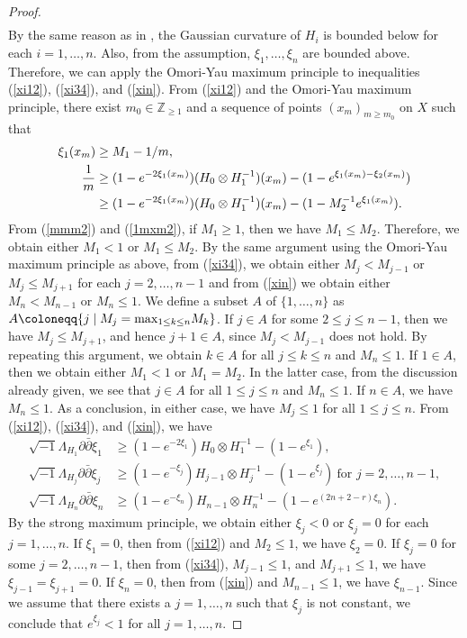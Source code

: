 \documentclass[12pt]{article}
\theoremstyle{definition}
\def\max{{\rm max}}
\def\Z{{\mathbb Z}}
\def\inum{{\sqrt{-1}}}
\begin{document}
\begin{proof}
\begin{align}
\end{align}
By the same reason as in \cite[Lemma 2.4]{LM1}, the Gaussian curvature of $H_i$ is bounded below for each $i=1,\dots, n$. Also, from the assumption, $\xi_1,\dots, \xi_n$ are bounded above. Therefore, we can apply the Omori-Yau maximum principle to inequalities (\ref{xi12}), (\ref{xi34}), and (\ref{xin}). 
From (\ref{xi12}) and the Omori-Yau maximum principle, there exist $m_0\in\Z_{\geq 1}$ and a sequence of points $(x_m)_{m\geq m_0}$ on $X$ such that
\begin{align}
\xi_1(x_m)&\geq M_1-1/m, \label{mmm2}\\
\frac{1}{m}&\geq (1-e^{-2\xi_1(x_m)})(H_0\otimes H_1^{-1})(x_m)-(1-e^{\xi_1(x_m)-\xi_2(x_m)}) \notag \\
&\geq (1-e^{-2\xi_1(x_m)})(H_0\otimes H_1^{-1})(x_m)-(1-M_2^{-1}e^{\xi_1(x_m)}). \label{1mxm2}
\end{align}
From (\ref{mmm2}) and (\ref{1mxm2}), if $M_1\geq 1$, then we have $M_1\leq M_2$. Therefore, we obtain either $M_1<1$ or $M_1\leq M_2$. By the same argument using the Omori-Yau maximum principle as above, from (\ref{xi34}), we obtain either $M_j< M_{j-1}$ or $M_j\leq M_{j+1}$ for each $j=2,\dots, n-1$ and from (\ref{xin}) we obtain either $M_n<M_{n-1}$ or $M_n\leq 1$. We define a subset $A$ of $\{1,\dots, n\}$ as $A\coloneqq \{j\mid M_j=\max_{1\leq k\leq n}M_k\}$. If $j\in A$ for some $2\leq j\leq n-1$, then we have $M_j \leq M_{j+1}$, and hence $j+1\in A$, since $M_j < M_{j-1}$ does not hold. By repeating this argument, we obtain $k\in A$ for all $j\leq k\leq n$ and $M_n\leq 1$. If $1\in A$, then we obtain either $M_1<1$ or $M_1=M_2$. In the latter case, from the discussion already given, we see that $j\in A$ for all $1\leq j\leq n$ and $M_n\leq 1$. If $n\in A$, we have $M_n\leq 1$. As a conclusion, in either case, we have $M_j\leq 1$ for all $1\leq j\leq n$. From (\ref{xi12}), (\ref{xi34}), and (\ref{xin}), we have
\begin{align}
\inum\Lambda_{H_1}\partial \bar{\partial} \xi_1&\geq (1-e^{-2\xi_1})H_0\otimes H_1^{-1}-(1-e^{\xi_1}), \label{xi12+}\\
\inum\Lambda_{H_j} \partial \bar{\partial} \xi_j &\geq (1-e^{-\xi_j})H_{j-1}\otimes H_j^{-1}-(1-e^{\xi_j}) \ \text{for $j=2,\dots, n-1$}, \label{xi34+}\\
\inum \Lambda_{H_n}\partial \bar{\partial} \xi_n&\geq (1-e^{-\xi_n})H_{n-1}\otimes H_n^{-1}-(1-e^{(2n+2-r)\xi_n}). \label{xin+}
\end{align}
By the strong maximum principle, we obtain either $\xi_j<0$ or $\xi_j=0$ for each $j=1,\dots, n$. If $\xi_1=0$, then from (\ref{xi12}) and $M_2\leq 1$, we have $\xi_2=0$. If $\xi_j=0$ for some $j=2,\dots, n-1$, then from (\ref{xi34}), $M_{j-1}\leq 1$, and $M_{j+1}\leq 1$, we have $\xi_{j-1}=\xi_{j+1}=0$. If $\xi_n=0$, then from (\ref{xin}) and $M_{n-1}\leq 1$, we have $\xi_{n-1}$. Since we assume that there exists a $j=1,\dots, n$ such that $\xi_j$ is not constant, we conclude that $e^{\xi_j}<1$ for all $j=1,\dots, n$.
\end{proof}
\end{document}

